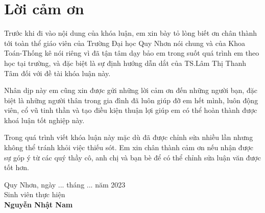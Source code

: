 \documentclass[12pt,a4paper,oneside]{report}
\numberwithin{equation}{section}
\begin{document}
\newpage
\chapter*{Lời cảm ơn}
\begin{justify}
Trước khi đi vào nội dung của khóa luận, em xin bày tỏ lòng biết ơn chân thành tới toàn thể giáo viên của Trường Đại học Quy Nhơn nói chung và của Khoa Toán-Thống kê nói riêng vì đã tận tâm dạy bảo em trong suốt quá trình em theo học tại trường, và đặc biệt là sự định hướng dẫn dắt của TS.Lâm Thị Thanh Tâm đối với đề tài khóa luận này.

Nhân dịp này em cũng xin được gửi những lời cảm ơn đến những người bạn, đặc biệt là những người thân trong gia đình đã luôn giúp đỡ em hết mình, luôn động viên, cổ vũ tinh thần và tạo điều kiện thuận lợi giúp em có thể hoàn thành được khoá luận tốt nghiệp này.

Trong quá trình viết khóa luận này mặc dù đã được chỉnh sửa nhiều lần nhưng không thể tránh khỏi việc thiếu sót. Em xin chân thành cảm ơn nếu nhận được sự góp ý từ các quý thầy cô, anh chị và bạn bè để có thể chỉnh sửa luận văn được tốt hơn.
\end{justify}
\vskip 0.5cm
\begin{flushright}
Quy Nhơn, ngày ... tháng ... năm 2023\qquad\\
Sinh viên thực hiện\qquad\qquad\qquad\qquad\\

\vskip 2.5cm
\textbf{  Nguyễn Nhật Nam}\qquad\quad\quad\quad\qquad\\
\end{flushright}

\tableofcontents

\end{document}
